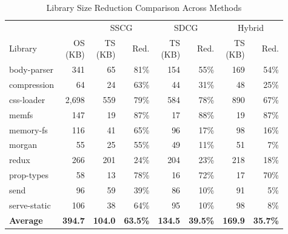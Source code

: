 \begin{table}[htbp]
\centering
\caption{Library Size Reduction Comparison Across Methods}
\label{tab:size_reduction}
\small
\setlength{\tabcolsep}{3.8pt}
\renewcommand{\arraystretch}{1.10}
\begin{tabular*}{1.0\linewidth}{@{\extracolsep{\fill}}lrrrrrrr@{}}
\toprule
& & \multicolumn{2}{c}{SSCG} & \multicolumn{2}{c}{SDCG} & \multicolumn{2}{c}{Hybrid} \\
\cmidrule(lr){3-4}\cmidrule(lr){5-6}\cmidrule(l){7-8}
Library & \makecell[r]{OS\\(KB)} & \makecell[r]{TS\\(KB)} & Red. & \makecell[r]{TS\\(KB)} & Red. & \makecell[r]{TS\\(KB)} & Red. \\
\midrule
body-parser & 341 & 65 & 81\% & 154 & 55\% & 169 & 54\% \\
compression & 64 & 24 & 63\% & 44 & 31\% & 48 & 25\% \\
css-loader & 2,698 & 559 & 79\% & 584 & 78\% & 890 & 67\% \\
memfs & 147 & 19 & 87\% & 17 & 88\% & 19 & 87\% \\
memory-fs & 116 & 41 & 65\% & 96 & 17\% & 98 & 16\% \\
morgan & 55 & 25 & 55\% & 49 & 11\% & 51 & 7\% \\
redux & 266 & 201 & 24\% & 204 & 23\% & 218 & 18\% \\
prop-types & 58 & 13 & 78\% & 16 & 72\% & 17 & 70\% \\
send & 96 & 59 & 39\% & 86 & 10\% & 91 & 5\% \\
serve-static & 106 & 38 & 64\% & 95 & 10\% & 98 & 8\% \\
\midrule
\textbf{Average} & \textbf{394.7} & \textbf{104.0} & \textbf{63.5\%} & \textbf{134.5} & \textbf{39.5\%} & \textbf{169.9} & \textbf{35.7\%} \\
\bottomrule
\end{tabular*}
\end{table}
